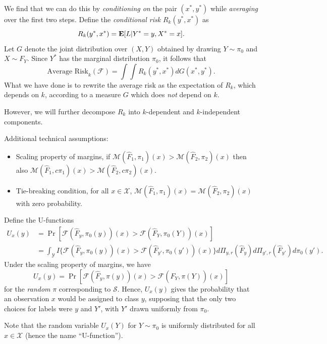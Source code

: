 \documentclass[12pt]{article}
\begin{document}
We find that we can do this by \emph{conditioning on} the pair $(x^*,
y^*)$ while \emph{averaging} over the first two steps.
Define the \emph{conditional risk} $R_k(y^*, x^*)$ as
\[
R_k(y^*, x^*) = \textbf{E}[L|Y^*=y, X^* = x].
\]
Let $G$ denote the joint distribution over $(X, Y)$ obtained by
drawing $Y \sim \pi_0$ and $X \sim F_Y$.  Since $Y^*$ has the marginal
distribution $\pi_0$, it follows that
\begin{equation}\label{eq:rk_eq}
\text{Average Risk}_k(\mathcal{F}) = \int \int R_k(y^*, x^*) dG(x^*, y^*).
\end{equation}
What we have done is to rewrite the average risk as the expectation of
$R_k$, which depends on $k$, according to a measure $G$ which does
\emph{not} depend on $k$.

However, we will further decompose $R_k$ into $k$-dependent and $k$-independent components.

Additional technical assumptions:
\begin{itemize}
\item 
Scaling property of margins, if $\mathcal{M}(\hat{F}_1, \pi_1)(x) >
\mathcal{M}(\hat{F}_2, \pi_2)(x)$ then also $\mathcal{M}(\hat{F}_1,
c\pi_1)(x) > \mathcal{M}(\hat{F}_2, c\pi_2)(x)$.
\item 
Tie-breaking condition, for all $x \in \mathcal{X}$,
$\mathcal{M}(\hat{F}_1, \pi_1)(x) = \mathcal{M}(\hat{F}_2, \pi_2)(x)$
with zero probability.
\end{itemize}

Define the U-functions
\begin{align}\label{eq:ufunc}
U_x(y) &= \Pr[\mathcal{F}(\hat{F}_y, \pi_0(y))(x) > \mathcal{F}(\hat{F}_Y, \pi_0(Y))(x)]
\\&= \int_{\mathcal{Y}} 
I\{
\mathcal{F}(\hat{F}_y, \pi_0(y))(x) > \mathcal{F}(\hat{F}_{y'}, \pi_0(y'))(x)
\}
d\Pi_{y, r}(\hat{F}_y)
d\Pi_{y', r}(\hat{F}_{y'})
d\pi_0(y').
\end{align}
Under the scaling property of margins, we have
\[
U_x(y) =  \Pr[\mathcal{F}(\hat{F}_y, \pi(y))(x) > \mathcal{F}(\hat{F}_Y, \pi(Y))(x)]
\]
for the \emph{random} $\pi$ corresponding to $\mathcal{S}$.  Hence,
$U_x(y)$ gives the probability that an observation $x$ would be
assigned to class $y$, supposing that the only two choices for labels
were $y$ and $Y'$, with $Y'$ drawn uniformly from $\pi_0$.

Note that the random variable $U_x(Y)$ for $Y \sim \pi_0$ is uniformly
distributed for all $x \in \mathcal{X}$ (hence the name ``U-function'').
\end{document}
